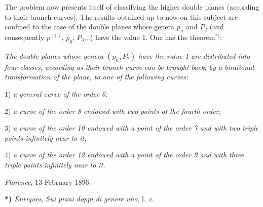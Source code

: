 \documentclass{article}
\begin{document}
The problem now presents itself of classifying the higher double planes (according to their branch curves). The results obtained up to now on this subject are confined to the case of the double planes whose genera $p_{n}$ and $P_{2}$ (and consequently $p^{(1)}$, $p_{g}$, $P_{3} \ldots$) have the value 1. One has the theorem${}^{*)}$:

\emph{The double planes whose genera $(p_{n}, P_{2})$ have the value 1 are distributed into four classes, according as their branch curve can be brought back, by a birational transformation of the plane, to one of the following curves:}

1) \emph{a general curve of the order 6:}

2) \emph{a curve of the order 8 endowed with two points of the fourth order;}

3) \emph{a curve of the order 10 endowed with a point of the order 7 and with two triple points infinitely near to it;}

4) \emph{a curve of the order 12 endowed with a point of the order 9 and with three triple points infinitely near to it.}

\emph{Florence}, 13 February 1896.

\textbf{*)} \emph{Enriques}, \emph{Sui piani doppi di genere uno}, l.\ c.
\end{document}
